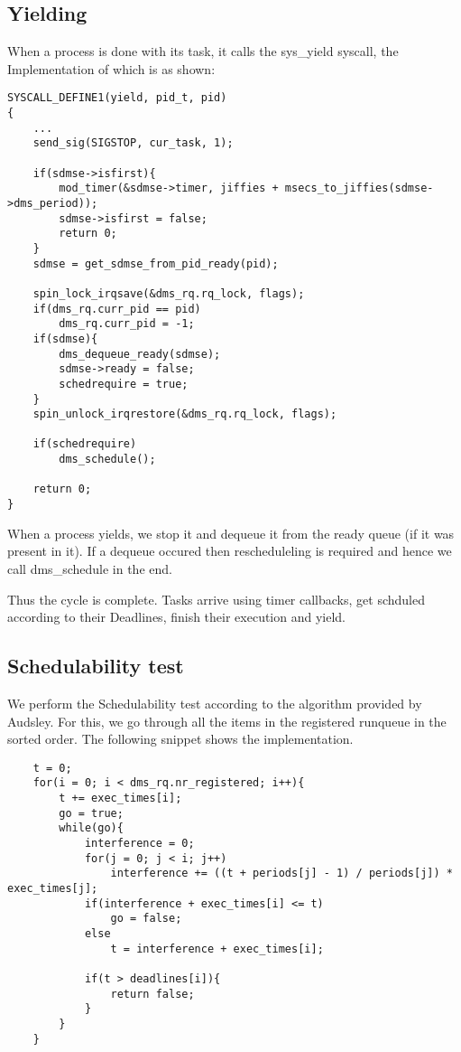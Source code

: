 \documentclass[12pt, letterpaper]{article}
\begin{document}
\subsection{Yielding}
When a process is done with its task, it calls the sys\_yield syscall, the Implementation of which is as shown: 

\begin{lstlisting}
SYSCALL_DEFINE1(yield, pid_t, pid)
{
    ...
    send_sig(SIGSTOP, cur_task, 1);

    if(sdmse->isfirst){
        mod_timer(&sdmse->timer, jiffies + msecs_to_jiffies(sdmse->dms_period));
        sdmse->isfirst = false;
        return 0;
    }
    sdmse = get_sdmse_from_pid_ready(pid);

    spin_lock_irqsave(&dms_rq.rq_lock, flags);
    if(dms_rq.curr_pid == pid)
        dms_rq.curr_pid = -1;
    if(sdmse){
        dms_dequeue_ready(sdmse);
        sdmse->ready = false;
        schedrequire = true;
    }
    spin_unlock_irqrestore(&dms_rq.rq_lock, flags);

    if(schedrequire)
        dms_schedule();

    return 0;
}
\end{lstlisting}
When a process yields, we stop it and dequeue it from the ready queue (if it was present in it). If a dequeue occured then rescheduleling is required and hence we call {\ttfamily dms\_schedule} in the end.

Thus the cycle is complete. Tasks arrive using timer callbacks, get schduled according to their Deadlines, finish their execution and yield.
\subsection{Schedulability test}
We perform the Schedulability test according to the algorithm provided by Audsley. For this, we go through all the items in the registered runqueue in the sorted order. The following snippet shows the 
implementation.
\begin{lstlisting}
    t = 0;
    for(i = 0; i < dms_rq.nr_registered; i++){
        t += exec_times[i];
        go = true;
        while(go){
            interference = 0;
            for(j = 0; j < i; j++)
                interference += ((t + periods[j] - 1) / periods[j]) * exec_times[j];
            if(interference + exec_times[i] <= t)
                go = false;
            else
                t = interference + exec_times[i];

            if(t > deadlines[i]){
                return false;
            }
        }
    }
\end{lstlisting}
\end{document}
